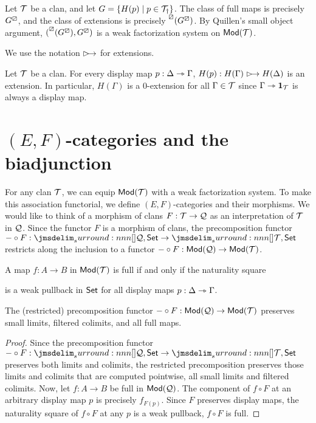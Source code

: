 \documentclass[a4paper]{article}
\begin{document}
\begin{remark}
  Let $\mathcal{T}$ be a clan, and let $G = \{H(p) \mid p \in \mathcal{T}_{\dag}\}$.
  The class of full maps is precisely $G^{\boxslash}$, and the class of extensions is precisely $\prescript{\boxslash}{}{(G^{\boxslash})}$.
  By Quillen's small object argument, $(\prescript{\boxslash}{}{(G^{\boxslash})},G^{\boxslash})$ is a weak factorization system on $\mathsf{Mod}(\mathcal{T})$.
\end{remark}

\begin{notation}
  We use the notation $\extension$ for extensions.
\end{notation}

\begin{remark}
  Let $\mathcal{T}$ be a clan.
  For every display map $p : \Delta \rightarrowtriangle \Gamma$, $H(p) : H(\Gamma) \extension H(\Delta)$ is an extension.
  In particular, $H(\Gamma)$ is a $0$-extension for all $\Gamma \in \mathcal{T}$ since $\Gamma \rightarrowtriangle \mathbf{1}_{\mathcal{T}}$ is always a display map.
\end{remark}

\section{$(E,F)$-categories and the biadjunction}
For any clan $\mathcal{T}$, we can equip $\mathsf{Mod}(\mathcal{T})$ with a weak factorization system.
To make this association functorial, we define $(E,F)$-categories and their morphisms.
We would like to think of a morphism of clans $F : \mathcal{T} \to \mathcal{Q}$ as an interpretation of $\mathcal{T}$ in $\mathcal{Q}$.
Since the functor $F$ is a morphism of clans, the precomposition functor $- \circ F : \funCat{\cQ}{\Set} \to \funCat{\cT}{\Set}$ restricts along the inclusion to a functor $- \circ F : \mathsf{Mod}(\mathcal{Q}) \to \mathsf{Mod}(\mathcal{T})$.

\begin{remark}
  A map $f : A \to B$ in $\mathsf{Mod}(\mathcal{T})$ is full if and only if the naturality square
  \begin{center}
  \end{center}
  is a weak pullback in $\mathsf{Set}$ for all display maps $p : \Delta \rightarrowtriangle \Gamma$.
\end{remark}

\begin{lemma}
  The (restricted) precomposition functor $- \circ F : \mathsf{Mod}(\mathcal{Q}) \to \mathsf{Mod}(\mathcal{T})$ preserves small limits, filtered colimits, and all full maps.
\end{lemma}
\begin{proof}
  Since the precomposition functor $- \circ F : \funCat{\cQ}{\Set} \to \funCat{\cT}{\Set}$ preserves both limits and colimits, the restricted precomposition preserves those limits and colimits that are computed pointwise, \ie all small limits and filtered colimits.
  Now, let $f : A \to B$ be full in $\mathsf{Mod}(\mathcal{Q})$.
  The component of $f \circ F$ at an arbitrary display map $p$ is precisely $f_{F(p)}$.
  Since $F$ preserves display maps, the naturality square of $f \circ F$ at any $p$ is a weak pullback, \ie $f \circ F$ is full.
\end{proof}
\end{document}
